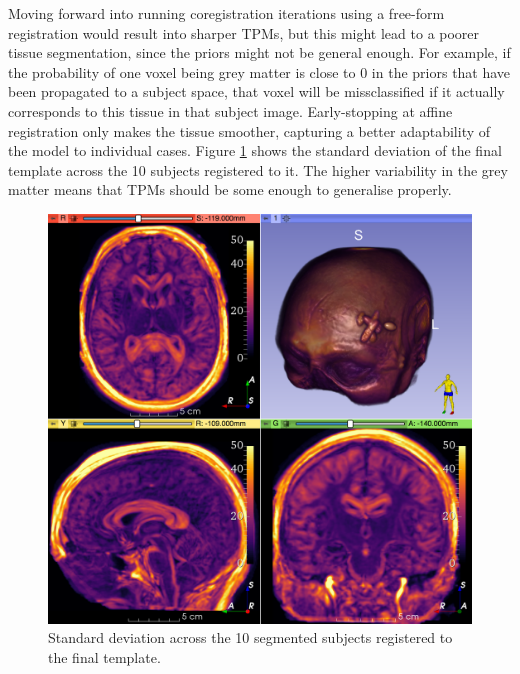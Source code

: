 Moving forward into running coregistration iterations using a free-form registration would result into sharper TPMs, but this might lead to a poorer tissue segmentation, since the priors might not be general enough. For example, if the probability of one voxel being grey matter is close to 0 in the priors that have been propagated to a subject space, that voxel will be missclassified if it actually corresponds to this tissue in that subject image. Early-stopping at affine registration only makes the tissue smoother, capturing a better adaptability of the model to individual cases. Figure \ref{fig:template-std} shows the standard deviation of the final template across the 10 subjects registered to it. The higher variability in the grey matter means that TPMs should be some enough to generalise properly.

\begin{figure}
  \includegraphics[width=\textwidth]{figures/affine_9_std}
  \centering
  \caption{Standard deviation across the 10 segmented subjects registered to the final template.}
  \label{fig:template-std}
\end{figure}
